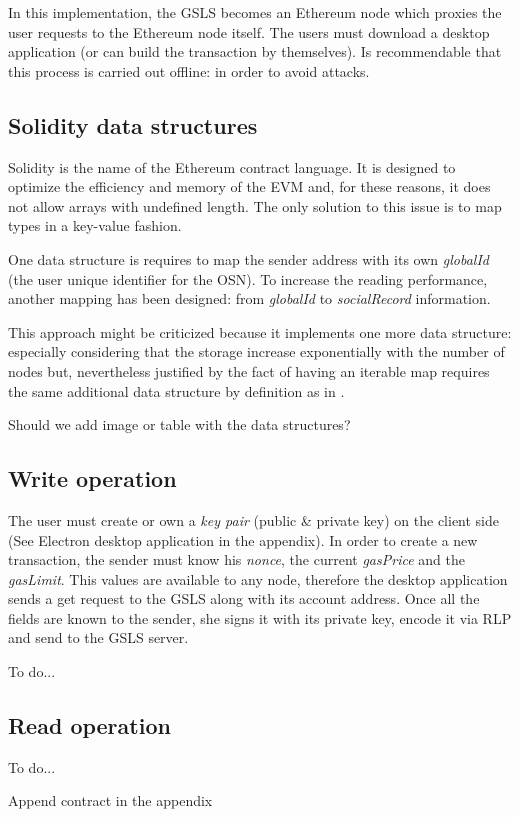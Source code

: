 In this implementation, the GSLS becomes an Ethereum node which proxies the user requests to the Ethereum node itself.
The users must download a desktop application (or can build the transaction by themselves). Is recommendable that this process is carried out offline: in order to avoid attacks.

\subsection{Solidity data structures}
Solidity is the name of the Ethereum contract language. It is designed to optimize the efficiency and memory of the EVM and, for these reasons, it does not allow arrays with undefined length.
The only solution to this issue is to map types in a key-value fashion.

One data structure is requires to map the sender address with its own \textit{globalId} (the user unique identifier for the OSN).  To increase the reading performance, another mapping has been designed: from \textit{globalId} to \textit{socialRecord} information.

This approach might be criticized because it implements one more data structure: especially considering that the storage increase exponentially with the number of nodes but, nevertheless justified by the fact of having an iterable map requires the same additional data structure by definition as in \cite{datastructure_solidity}.

\begin{notation}
  Should we add image or table with the data structures?
\end{notation}


\subsection{Write operation}
The user must create or own a \textit{key pair} (public \& private key) on the client side (See Electron desktop application in the appendix).
In order to create a new transaction, the sender must know his \textit{nonce}, the current \textit{gasPrice} and the \textit{gasLimit}. This values are available to any node, therefore the desktop application sends a get request to the GSLS along with its account address. Once all the fields are known to the sender, she signs it with its private key, encode it via RLP and send to the GSLS server.

\begin{notation}
  To do...
\end{notation}

\subsection{Read operation}
\begin{notation}
  To do...
\end{notation}


\begin{notation}
  Append contract in the appendix
\end{notation}